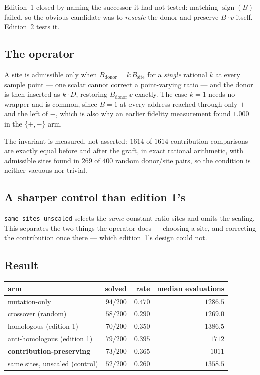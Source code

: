\documentclass[11pt,a4paper]{article}
\theoremstyle{definition}
\theoremstyle{remark}
\begin{document}
Edition~1 closed by naming the successor it had not tested: matching
$\operatorname{sign}(B)$ failed, so the obvious candidate was to \emph{rescale}
the donor and preserve $B\cdot v$ itself. Edition~2 tests it.

\subsection{The operator}

A site is admissible only when $B_{\text{donor}} = k\,B_{\text{site}}$ for a
\emph{single} rational $k$ at every sample point --- one scalar cannot correct a
point-varying ratio --- and the donor is then inserted as $k\cdot D$, restoring
$B_{\text{donor}}\,v$ exactly. The case $k=1$ needs no wrapper and is common,
since $B=1$ at every address reached through only $+$ and the left of $-$, which
is also why an earlier fidelity measurement found $1.000$ in the $\{+,-\}$ arm.

The invariant is measured, not asserted: $1614$ of $1614$ contribution
comparisons are exactly equal before and after the graft, in exact rational
arithmetic, with admissible sites found in $269$ of $400$ random donor/site
pairs, so the condition is neither vacuous nor trivial.

\subsection{A sharper control than edition 1's}

\texttt{same\_sites\_unscaled} selects the \emph{same} constant-ratio sites and
omits the scaling. This separates the two things the operator does --- choosing a
site, and correcting the contribution once there --- which edition~1's design
could not.

\subsection{Result}

\begin{center}
\begin{tabular}{lrrr}
\toprule
arm & solved & rate & median evaluations \\
\midrule
mutation-only                     & $94/200$ & $0.470$ & $1286.5$ \\
crossover (random)                & $58/200$ & $0.290$ & $1269.0$ \\
homologous (edition 1)            & $70/200$ & $0.350$ & $1386.5$ \\
anti-homologous (edition 1)       & $79/200$ & $0.395$ & $1712$ \\
\textbf{contribution-preserving}  & $73/200$ & $0.365$ & $1011$ \\
same sites, unscaled (control)    & $52/200$ & $0.260$ & $1358.5$ \\
\bottomrule
\end{tabular}
\end{center}
\end{document}
